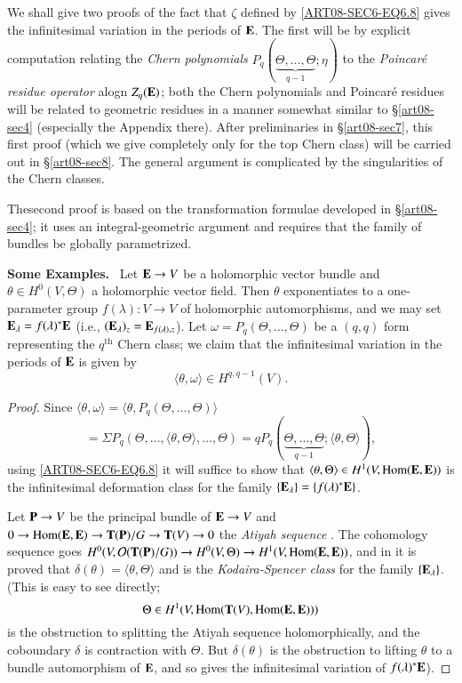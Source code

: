 We shall give two proofs of the fact that $\zeta$ defined by \eqref{ART08-SEC6-EQ6.8} gives the infinitesimal variation in the periods of $\mathbf{E}$. The first will be by explicit computation relating the {\em Chern polynomials} $P_{q}(\underbrace{\Theta,\ldots,\Theta}_{q-1};\eta)$ to the {\em Poincar\'e residue operator} alogn $Z_{q}(\mathbf{E})$; both the Chern polynomials and Poincar\'e residues will be related to geometric residues in a manner somewhat similar to \S\ref{art08-sec4} (especially the Appendix there). After preliminaries in \S\ref{art08-sec7}, this first proof (which we give completely only for the top Chern class) will be carried out in \S\ref{art08-sec8}. The general argument is complicated by the singularities of the Chern classes.

The\pageoriginale second proof is based on the transformation formulae developed in \S\ref{art08-sec4}; it uses an integral-geometric argument and requires that the family of bundles be globally parametrized.

\medskip
\noindent
{\bf Some Examples.}~ Let $\mathbf{E}\to V$ be a holomorphic vector bundle and $\theta\in H^{0}(V,\Theta)$ a holomorphic vector field. Then $\theta$ exponentiates to a one-parameter group $f(\lambda):V\to V$ of holomorphic automorphisms, and we may set $\mathbf{E}_{\lambda}=f(\lambda)^{*}\mathbf{E}$ (i.e., $(\mathbf{E}_{\lambda})_{z}=\mathbf{E}_{f(\lambda),z}$). Let $\omega=P_{q}(\Theta,\ldots,\Theta)$ be a $(q,q)$ form representing the $q^{\text{th}}$ Chern class; we claim that the infinitesimal variation in the periods of $\mathbf{E}$ is given by
\begin{equation}
\langle \theta,\omega\rangle \in H^{q,q-1}(V).\label{art08-sec6-eq6.9}
\end{equation}

\begin{proof}
Since $\langle \theta,\omega\rangle=\langle \theta, P_{q}(\Theta,\ldots,\Theta)\rangle$
$$
=\Sigma P_{q}(\Theta,\ldots,\langle \theta,\Theta\rangle,\ldots,\Theta)=qP_{q}(\underbrace{\Theta,\ldots,\Theta}_{q-1};\langle \theta,\Theta\rangle),
$$
using \eqref{ART08-SEC6-EQ6.8} it will suffice to show that $\langle \theta,\Theta\rangle\in H^{1}(V,\operatorname{\mathrm{Hom}}(\mathbf{E},\mathbf{E}))$ is the infinitesimal deformation class for the family $\{\mathbf{E}_{\lambda}\}=\{f(\lambda)^{*}\mathbf{E}\}$. 

Let $\mathbf{P}\to V$ be the principal bundle of $\mathbf{E}\to V$ and $0\to \Hom(\bfE,\bfE)\break \to \bfT(\bfP)/G\to \bfT(V)\to 0$ the {\em Atiyah sequence} \cite{art08-key1}. The cohomology sequence goes $H^{0}(V,\mathcal{O}(\mathbf{T}(\mathbf{P})/G))\to H^{0}(V,\Theta)\to H^{1}(V,\operatorname{\mathrm{Hom}}(\mathbf{E},\mathbf{E}))$, and in \cite{art08-key8} it is proved that $\delta(\theta)=\langle \theta,\Theta\rangle$ and is the {\em Kodaira-Spencer class} for the family $\{\mathbf{E}_{\lambda}\}$. (This is easy to see directly; 
$$
\Theta\in H^{1}(V,\operatorname{\mathrm{Hom}}(\mathbf{T}(V),\operatorname{\mathrm{Hom}}(\mathbf{E},\mathbf{E})))
$$ 
is the obstruction to splitting the Atiyah sequence holomorphically, and the coboundary $\delta$ is contraction with $\Theta$. But $\delta(\theta)$ is the obstruction to lifting $\theta$ to a bundle automorphism of $\mathbf{E}$, and so gives the infinitesimal variation of $f(\lambda)^{*}\mathbf{E}$).
\end{proof}


